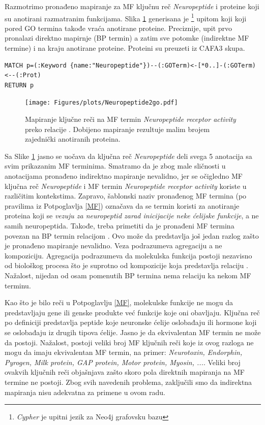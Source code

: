 Razmotrimo pronađeno mapiranje za MF ključnu reč \textit{Neuropeptide} i
proteine koji su anotirani razmatranim funkcijama. Slika \ref{fig:neuropeptide}
generisana je \footnote{\textit{Cypher} je upitni jezik za
Neo4j grafovsku bazu} upitom koji koji pored GO termina takođe vraća anotirane
proteine. Preciznije, upit prvo pronalazi direktno mapirnje (BP termin)  a
zatim sve potomke (indirektne MF termine) i na kraju anotirane proteine.
Proteini su preuzeti iz CAFA3 skupa. 

{ \small
\begin{verbatim}
MATCH p=(:Keyword {name:"Neuropeptide"})--(:GOTerm)<-[*0..]-(:GOTerm)<--(:Prot)
RETURN p
\end{verbatim}
}

\begin{figure}[!th]
\centering
\hspace*{-1.0cm} 
\texttt{[image: Figures/plots/Neuropeptide2go.pdf]}
\decoRule
\caption {
  Mapiranje ključne reči  na MF termin
  \textit{Neuropeptide receptor activity} preko relacije .
  Dobijeno mapiranje rezultuje malim brojem zajednički anotiranih proteina.
}
\label{fig:neuropeptide}
\end{figure}

Sa Slike \ref{fig:neuropeptide} jasno se uočava da ključna reč
\textit{Neuropeptide} deli svega 5 anotacija sa svim prikazanim MF terminima.
Smatramo da je zbog male sličnosti u anotacijama pronađeno indirektno
mapiranje nevalidno, jer se očigledno MF ključna reč \textit{Neuropeptide} i
MF termin \textit{Neuropeptide receptor activity} koriste u različitim
kontekstima. Zapravo, šablonski naziv pronađenog MF termina (po pravilima iz
Potpoglavlja \ref{MF}) označava da se termin koristi za anotiranje proteina
koji se \textit{vezuju za neuropeptid zarad inicijacije neke ćelijske
funkcije}, a ne samih neuropeptida. Takođe, treba primetiti da je pronađeni MF
termina povezan na BP termin relacijom .  Ovo može da
predstavlja još jedan razlog zašto je pronađeno mapiranje nevalidno.  Veza
 podrazumeva agregaciju a ne kompoziciju. Agregacija
podrazumeva da  molekulska funkcija postoji nezavisno od biološkog procesa što
je suprotno od kompozicije koja predstavlja relaciju . Nažalost,
nijedan od osam pomenutih BP termina nema relaciju  ka nekom MF
terminu.

\clearpage

Kao što je bilo reči u Potpoglavlju \ref{MF}, molekulske funkcije ne mogu da
predstavljaju gene ili genske produkte već funkcije koje oni obavljaju. Ključna
reč  po definiciji predstavlja peptide koje neuronske
ćelije oslobađaju ili hormone koji se oslobađaju iz drugih tipova ćelije. Jasno
je da ekvivalentan MF termin ne može da postoji.  Nažalost, postoji veliki broj
MF ključnih reči koje iz ovog razloga ne mogu da imaju ekvivalentan MF termin,
na primer: \textit{ Neurotoxin, Endorphin, Pyrogen, Milk protein, GAP protein,
Motor protein, Myosin, ...}. Veliki broj ovakvih ključnih reči objašnjava 
zašto skoro pola direktnih mapiranja na MF termine ne postoji.  Zbog svih
navedenih problema, zaključili smo da indirektna mapiranja nisu adekvatna za
primene u ovom radu.

